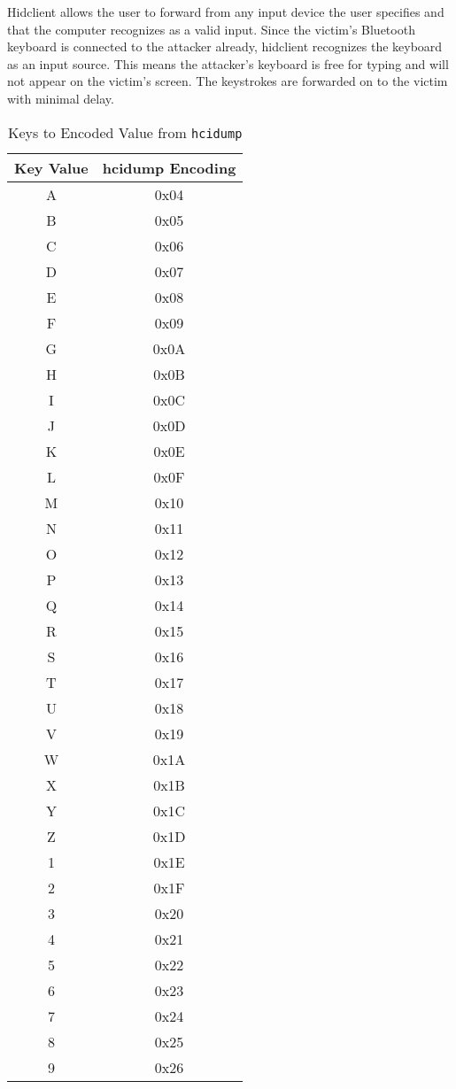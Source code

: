 \documentclass{acm_proc_article-sp}
\begin{document}
Hidclient allows the user to forward from any input device the user specifies and that the computer recognizes as a valid input. Since the victim's Bluetooth keyboard is connected to the attacker already, hidclient recognizes the keyboard as an input source. This means the attacker's keyboard is free for typing and will not appear on the victim's screen. The keystrokes are forwarded on to the victim with minimal delay. 
\begin{table}
\begin{tabular}{|c|c|}
\hline
Key Value & hcidump Encoding\\\hline
A&0x04\\
B&0x05\\
C&0x06\\ 
D&0x07\\
E&0x08\\
F&0x09\\
G&0x0A\\
H&0x0B\\
I&0x0C\\
J&0x0D\\
K&0x0E\\
L&0x0F\\
M&0x10\\
N&0x11\\
O&0x12\\
P&0x13\\
Q&0x14\\
R&0x15\\
S&0x16\\
T&0x17\\
U&0x18\\
V&0x19\\
W&0x1A\\
X&0x1B\\
Y&0x1C\\
Z&0x1D\\
1&0x1E\\
2&0x1F\\
3&0x20\\
4&0x21\\
5&0x22\\
6&0x23\\
7&0x24\\
8&0x25\\
9&0x26\\\hline
\end{tabular}
\begin{center}
\caption{Keys to Encoded Value from \texttt{hcidump}}
\end{center}
\label{table1}
\end{table}
\end{document}
